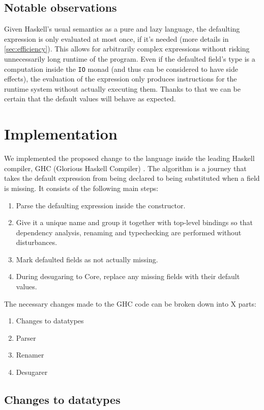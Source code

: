 \documentclass[en]{pracamgr}
\begin{document}
\section{Notable observations}
Given Haskell's usual semantics as a pure and lazy language, the defaulting expression is only evaluated at most once, if it's needed (more details in \ref{sec:efficiency}).
This allows for arbitrarily complex expressions without risking unnecessarily long runtime of the program. 
Even if the defaulted field's type is a computation inside the \texttt{IO} monad (and thus can be considered to have side effects), the evaluation of the expression only produces instructions for the runtime system without actually executing them.
Thanks to that we can be certain that the default values will behave as expected.


\chapter{Implementation}

We implemented the proposed change to the language inside the leading Haskell compiler, GHC (Glorious Haskell Compiler) \cite{HudakHaskell}.
The algorithm is a journey that takes the default expression from being declared to being substituted when a field is missing.
It consists of the following main steps:
\begin{enumerate}
  \item Parse the defaulting expression inside the constructor.
  \item Give it a unique name and group it together with top-level bindings so that dependency analysis, renaming and typechecking are performed without disturbances.
  \item Mark defaulted fields as not actually missing.
  \item During desugaring to Core, replace any missing fields with their default values.
\end{enumerate}

The necessary changes made to the GHC code can be broken down into X parts:
\begin{enumerate}
  \item Changes to datatypes
  \item Parser
  \item Renamer
  \item Desugarer
\end{enumerate}

\section{Changes to datatypes} 
\end{document}
